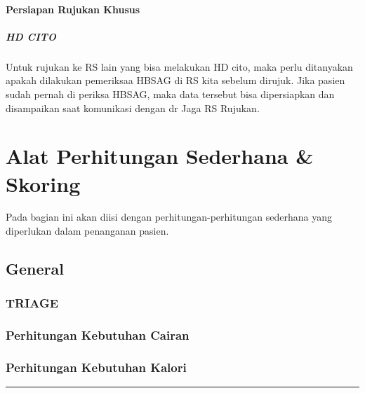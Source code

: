 \documentclass[
]{book}
\begin{document}
\hypertarget{persiapan-rujukan-khusus}{%
\subsubsection{Persiapan Rujukan Khusus}\label{persiapan-rujukan-khusus}}

\hypertarget{hd-cito}{%
\paragraph{HD CITO}\label{hd-cito}}

Untuk rujukan ke RS lain yang bisa melakukan HD cito, maka perlu ditanyakan apakah dilakukan pemeriksaa HBSAG di RS kita sebelum dirujuk. Jika pasien sudah pernah di periksa HBSAG, maka data tersebut bisa dipersiapkan dan disampaikan saat komunikasi dengan dr Jaga RS Rujukan.

\hypertarget{alat-perhitungan-sederhana-skoring}{%
\chapter{Alat Perhitungan Sederhana \& Skoring}\label{alat-perhitungan-sederhana-skoring}}

Pada bagian ini akan diisi dengan perhitungan-perhitungan sederhana yang diperlukan dalam penanganan pasien.

\hypertarget{general}{%
\section{General}\label{general}}

\hypertarget{triage}{%
\subsection{TRIAGE}\label{triage}}

\hypertarget{perhitungan-kebutuhan-cairan}{%
\subsection{Perhitungan Kebutuhan Cairan}\label{perhitungan-kebutuhan-cairan}}

\hypertarget{perhitungan-kebutuhan-kalori}{%
\subsection{Perhitungan Kebutuhan Kalori}\label{perhitungan-kebutuhan-kalori}}

\begin{center}\rule{0.5\linewidth}{0.5pt}\end{center}
\end{document}
